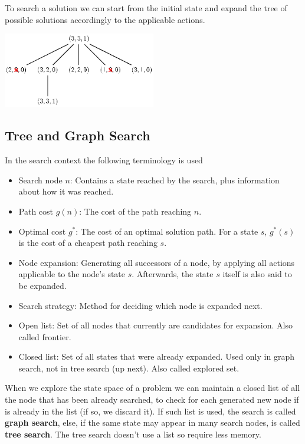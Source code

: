 \documentclass[10pt, letterpaper]{report}
\begin{document}
To search a solution we can start from the initial state and expand the tree of possible solutions accordingly to the applicable actions.\begin{center}
    \includegraphics[width=0.5\textwidth ]{images/missionaries.eps}
\end{center}
\subsection{Tree and Graph Search}
In the search context the following terminology is used
\begin{itemize}
    \item Search node $n$: Contains a state reached by the search, plus information about how it was reached.
    \item Path cost $g(n)$: The cost of the path reaching $n$.
    \item Optimal cost $g^*$: The cost of an optimal solution path. For a state $s$, $g^*(s)$ is the cost of a cheapest path reaching $s$.
    \item Node expansion: Generating all successors of a node, by applying all actions applicable to the node's state $s$. Afterwards, the state $s$ itself is also said to be expanded.
    \item Search strategy: Method for deciding which node is expanded next.
    \item Open list: Set of all nodes that currently are candidates for expansion. Also called frontier.
    \item Closed list: Set of all states that were already expanded. Used only in graph search, not in tree search (up next). Also called explored set.
\end{itemize}
When we explore the state space of a problem we can maintain a closed list of all the node that has been already searched, to check for each generated new node if is already in the list (if so, we discard it). If such list is used, the search is called \textbf{graph search}, else, if the same state may appear in many search nodes, is called \textbf{tree search}. The tree search doesn't use a list so require less memory.\bigskip
\end{document}
